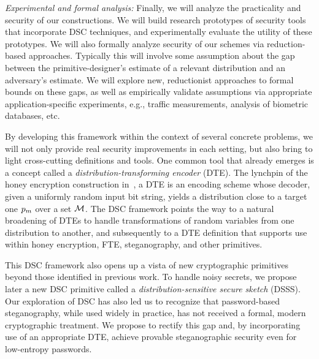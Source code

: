 {\begin{newenum}
\item{\em Experimental and formal analysis:} Finally, we will analyze the
practicality and security of our constructions. We will build
research prototypes of security tools that incorporate DSC techniques, and
experimentally evaluate the utility of these prototypes.  We will also formally analyze security of
our schemes via reduction-based approaches. Typically this will involve some
assumption about the gap between the primitive-designer's estimate of a
relevant distribution and an adversary's estimate. We will explore new,
reductionist approaches to formal bounds on these gaps, as well as
empirically validate assumptions via appropriate application-specific
experiments, e.g., traffic measurements, analysis of biometric databases, etc. 
\end{newenum}

By developing this framework within the context of several concrete problems,
we will not only provide real security improvements in each setting, but also
bring to light cross-cutting definitions and tools. One common tool that
already emerges is a concept called a {\em distribution-transforming encoder}
(DTE). The lynchpin of the honey encryption construction
in~\cite{HoneyEnc-EC:2014}, a DTE is an encoding scheme whose decoder, given a
uniformly random input bit string, yields a distribution close to a target one
$p_m$ over a set ${\cal{M}}$. The DSC framework points the way to a natural
broadening of DTEs to handle transformations of random variables from one
distribution to another, and subsequently to a DTE definition that supports
use within honey encryption, FTE, steganography, and other primitives. 

This DSC framework also opens up a vista of new cryptographic primitives beyond
those identified in previous work. To handle noisy secrets, we propose later a
new DSC primitive called a {\em distribution-sensitive secure sketch} (DSSS).
Our exploration of DSC has also led us to recognize that password-based
steganography, while used widely in practice, has not received a formal, modern
cryptographic treatment. We propose to rectify this gap and, by incorporating use of an
appropriate DTE, achieve provable steganographic security even for low-entropy
passwords.  



}
